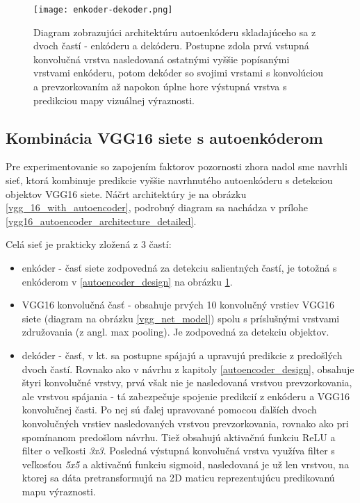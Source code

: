 \begin{figure}[H]
	\begin{center}
		\texttt{[image: enkoder-dekoder.png]}
		\caption[Diagram navrhnutého autoenkóderu]{
			Diagram zobrazujúci architektúru autoenkóderu skladajúceho sa z dvoch častí - enkóderu a dekóderu. Postupne zdola prvá vstupná konvolučná vrstva nasledovaná ostatnými vyššie popísanými vrstvami enkóderu, potom dekóder so svojimi vrstami s konvolúciou a prevzorkovaním až napokon úplne hore výstupná vrstva s predikciou mapy vizuálnej výraznosti. 
		}\label{autoencoder_structure}
	\end{center}
\end{figure}

\subsection{Kombinácia VGG16 siete s autoenkóderom}
\label{vgg16_combination_with_autoencoder}
Pre experimentovanie so zapojením faktorov pozornosti zhora nadol sme navrhli sieť, ktorá kombinuje predikcie vyššie navrhnutého autoenkóderu s detekciou objektov VGG16 siete. Náčrt architektúry je na obrázku \ref{vgg_16_with_autoencoder}, podrobný diagram sa nachádza v prílohe \ref{vgg16_autoencoder_architecture_detailed}. 

Celá sieť je prakticky zložená z 3 častí:
\begin{itemize}
	\item enkóder - časť siete zodpovedná za detekciu salientných častí, je totožná s enkóderom v \ref{autoencoder_design} na obrázku \ref{autoencoder_structure}.
	\item VGG16 konvolučná časť - obsahuje prvých 10 konvolučný vrstiev VGG16 siete (diagram na obrázku \ref{vgg_net_model}) spolu s príslušnými vrstvami združovania (z angl. max pooling). Je zodpovedná za detekciu objektov. 
	\item dekóder - časť, v kt. sa postupne spájajú a upravujú predikcie z predošlých dvoch častí. Rovnako ako v návrhu z kapitoly \ref{autoencoder_design}, obsahuje štyri konvolučné vrstvy, prvá však nie je nasledovaná vrstvou prevzorkovania, ale vrstvou spájania - tá zabezpečuje spojenie predikcií z enkóderu a VGG16 konvolučnej časti. Po nej sú ďalej upravované pomocou ďalších dvoch konvolučných vrstiev nasledovaných vrstvou prevzorkovania, rovnako ako pri spomínanom predošlom návrhu. Tiež obsahujú aktivačnú funkciu ReLU a filter o veľkosti \textit{3x3}. Posledná výstupná konvolučná vrstva využíva filter s veľkosťou \textit{5x5} a aktivačnú funkciu sigmoid, nasledovaná je už len vrstvou, na ktorej sa dáta pretransformujú na 2D maticu reprezentujúcu predikovanú mapu výraznosti.
\end{itemize}

